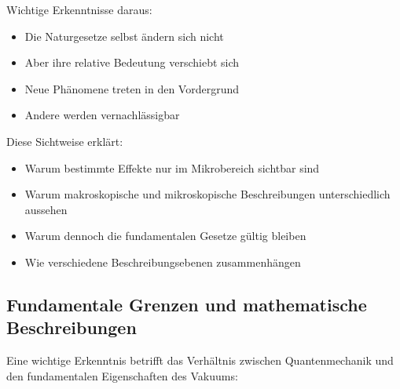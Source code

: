 \documentclass[12pt,a4paper]{article}
\begin{document}
	Wichtige Erkenntnisse daraus:
	\begin{itemize}
		\item Die Naturgesetze selbst ändern sich nicht
		\item Aber ihre relative Bedeutung verschiebt sich
		\item Neue Phänomene treten in den Vordergrund
		\item Andere werden vernachlässigbar
	\end{itemize}
	
	Diese Sichtweise erklärt:
	\begin{itemize}
		\item Warum bestimmte Effekte nur im Mikrobereich sichtbar sind
		\item Warum makroskopische und mikroskopische Beschreibungen unterschiedlich aussehen
		\item Warum dennoch die fundamentalen Gesetze gültig bleiben
		\item Wie verschiedene Beschreibungsebenen zusammenhängen
	\end{itemize}
	
	\subsection{Fundamentale Grenzen und mathematische Beschreibungen}
	
	Eine wichtige Erkenntnis betrifft das Verhältnis zwischen Quantenmechanik und den fundamentalen Eigenschaften des Vakuums:
	
\end{document}
